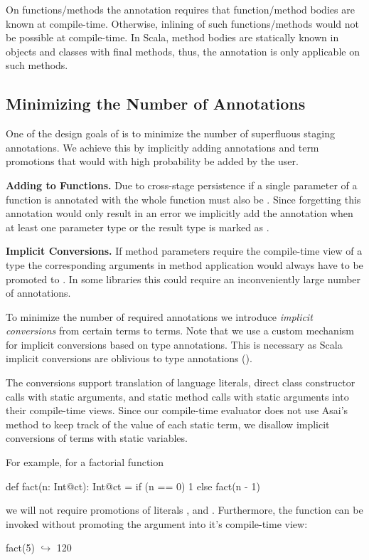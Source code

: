 On functions/methods the  annotation requires that function/method bodies are known at compile-time.
 Otherwise, inlining of such functions/methods would not be possible at compile-time. In Scala,
 method bodies are statically known in objects and classes with final methods, thus, the 
 annotation is only applicable on such methods.

\subsection{Minimizing the Number of Annotations}
\label{sct:implicits}

One of the design goals of \ct is to minimize the number of superfluous staging annotations. We achieve
 this by implicitly adding annotations and term promotions that would with high probability be added by the user.

{\bf Adding  to Functions.} Due to cross-stage persistence if a single parameter of
a function is annotated with  the whole function must also be . Since forgetting
this annotation would only result in an error we implicitly add
the  annotation when at least one parameter type or the result type is marked as .

{\bf Implicit Conversions.} If method parameters require the compile-time view of a type the corresponding arguments
 in method application would always have to be promoted to .
 In some libraries this could require an inconveniently large number of annotations.

To minimize the number of required annotations we introduce \emph{implicit conversions}
 from certain  terms to  terms. Note that we use a custom mechanism for
 implicit conversions based on type annotations. This is necessary as Scala implicit conversions
 are oblivious to type annotations ().

The conversions support translation of language literals, direct class constructor calls with static arguments, and static method
 calls with static arguments into their compile-time views. Since our compile-time evaluator does
 not use Asai's~\cite{asai2002binding,sumii2001hybrid} method to keep track of
 the value of each static term, we disallow implicit conversions of terms with static variables.

For example, for a factorial function \begin{lstparagraph}
def fact(n: Int@ct): Int@ct =
  if (n == 0) 1 else fact(n - 1)
 \end{lstparagraph} we will not require promotions of literals , and . Furthermore,
 the function can be invoked without promoting the argument into it's compile-time view:\begin{lstparagraph}
fact(5)
  $\hookrightarrow$ 120
 \end{lstparagraph}

